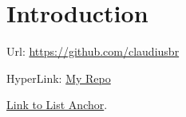 \section{Introduction} \label{sec:Introduction}


  \lipsum[1]

  Url: \url{https://github.com/claudiusbr}

  HyperLink: \href{https://github.com/claudiusbr}{My Repo}

  \hyperref[sec:Step2]{Link to List Anchor}.
